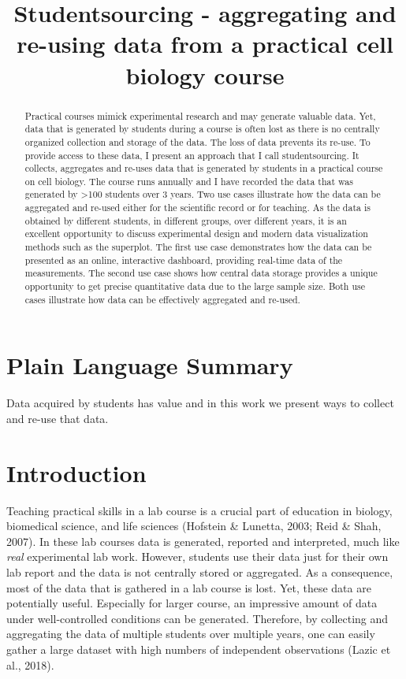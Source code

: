 \documentclass[
]{agujournal2019}
\begin{document}
\title{Studentsourcing - aggregating and re-using data from a practical
cell biology course}



\begin{abstract}
Practical courses mimick experimental research and may generate valuable
data. Yet, data that is generated by students during a course is often
lost as there is no centrally organized collection and storage of the
data. The loss of data prevents its re-use. To provide access to these
data, I present an approach that I call studentsourcing. It collects,
aggregates and re-uses data that is generated by students in a practical
course on cell biology. The course runs annually and I have recorded the
data that was generated by \textgreater100 students over 3 years. Two
use cases illustrate how the data can be aggregated and re-used either
for the scientific record or for teaching. As the data is obtained by
different students, in different groups, over different years, it is an
excellent opportunity to discuss experimental design and modern data
visualization methods such as the superplot. The first use case
demonstrates how the data can be presented as an online, interactive
dashboard, providing real-time data of the measurements. The second use
case shows how central data storage provides a unique opportunity to get
precise quantitative data due to the large sample size. Both use cases
illustrate how data can be effectively aggregated and re-used.
\end{abstract}

\section*{Plain Language Summary}
Data acquired by students has value and in this work we present ways to
collect and re-use that data.


\hypertarget{sec-introduction}{%
\section*{Introduction}\label{sec-introduction}}

Teaching practical skills in a lab course is a crucial part of education
in biology, biomedical science, and life sciences (Hofstein \& Lunetta,
2003; Reid \& Shah, 2007). In these lab courses data is generated,
reported and interpreted, much like \emph{real} experimental lab work.
However, students use their data just for their own lab report and the
data is not centrally stored or aggregated. As a consequence, most of
the data that is gathered in a lab course is lost. Yet, these data are
potentially useful. Especially for larger course, an impressive amount
of data under well-controlled conditions can be generated. Therefore, by
collecting and aggregating the data of multiple students over multiple
years, one can easily gather a large dataset with high numbers of
independent observations (Lazic et al., 2018).
\end{document}
